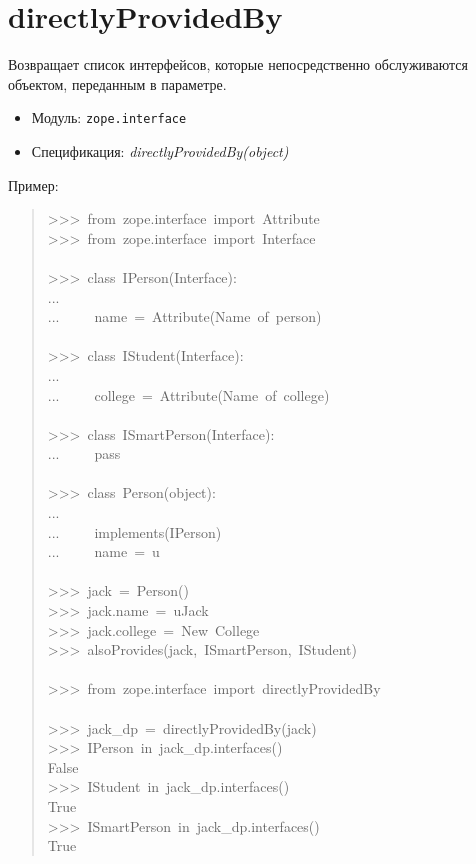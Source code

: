 \documentclass[a4paper,openany,twoside,final]{book}
\providecommand*{\DUroletitlereference}[1]{\textsl{#1}}
\begin{document}
\section*{directlyProvidedBy%
  \label{directlyprovidedby}%
}

Возвращает список интерфейсов, которые непосредственно обслуживаются
объектом, переданным в параметре.

\begin{itemize}

\item Модуль: \texttt{zope.interface}

\item Спецификация: \DUroletitlereference{directlyProvidedBy(object)}

\end{itemize}

Пример:

\begin{quote}{\ttfamily \raggedright \noindent
>{}>{}>~from~zope.interface~import~Attribute\\
>{}>{}>~from~zope.interface~import~Interface\\
~\\
>{}>{}>~class~IPerson(Interface):\\
...\\
...~~~~~name~=~Attribute(\textquotedbl{}Name~of~person\textquotedbl{})\\
~\\
>{}>{}>~class~IStudent(Interface):\\
...\\
...~~~~~college~=~Attribute(\textquotedbl{}Name~of~college\textquotedbl{})\\
~\\
>{}>{}>~class~ISmartPerson(Interface):\\
...~~~~~pass\\
~\\
>{}>{}>~class~Person(object):\\
...\\
...~~~~~implements(IPerson)\\
...~~~~~name~=~u\textquotedbl{}\textquotedbl{}\\
~\\
>{}>{}>~jack~=~Person()\\
>{}>{}>~jack.name~=~u\textquotedbl{}Jack\textquotedbl{}\\
>{}>{}>~jack.college~=~\textquotedbl{}New~College\textquotedbl{}\\
>{}>{}>~alsoProvides(jack,~ISmartPerson,~IStudent)\\
~\\
>{}>{}>~from~zope.interface~import~directlyProvidedBy\\
~\\
>{}>{}>~jack\_dp~=~directlyProvidedBy(jack)\\
>{}>{}>~IPerson~in~jack\_dp.interfaces()\\
False\\
>{}>{}>~IStudent~in~jack\_dp.interfaces()\\
True\\
>{}>{}>~ISmartPerson~in~jack\_dp.interfaces()\\
True
}
\end{quote}
\end{document}
